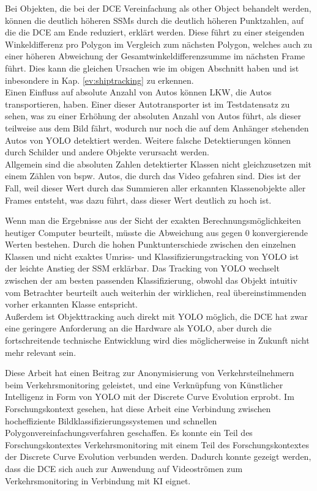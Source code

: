 {{	Bei Objekten, die bei der DCE Vereinfachung als \glqq other Object\grqq{} behandelt werden, können die deutlich höheren SSMs durch die deutlich höheren Punktzahlen, auf die die DCE am Ende reduziert, erklärt werden. Diese führt zu einer steigenden Winkeldifferenz pro Polygon im Vergleich zum nächsten Polygon, welches auch zu einer höheren Abweichung der Gesamtwinkeldifferenzsumme im nächsten Frame führt. Dies kann die gleichen Ursachen wie im obigen Abschnitt haben und ist inbesondere in Kap. \ref{ev:shiptracking} zu erkennen. \\

	Einen Einfluss auf absolute Anzahl von Autos können LKW, die Autos transportieren, haben. Einer dieser Autotransporter ist im Testdatensatz zu sehen, was zu einer Erhöhung der absoluten Anzahl von Autos führt, als dieser teilweise aus dem Bild fährt, wodurch nur noch die auf dem Anhänger stehenden Autos von YOLO detektiert werden. Weitere falsche Detektierungen können durch Schilder und andere Objekte verursacht werden. \\
	Allgemein sind die absoluten Zahlen detektierter Klassen nicht gleichzusetzen mit einem Zählen von bspw. Autos, die durch das Video gefahren sind. Dies ist der Fall, weil dieser Wert durch das Summieren aller erkannten Klassenobjekte aller Frames entsteht, was dazu führt, dass dieser Wert deutlich zu hoch ist.

	Wenn man die Ergebnisse aus der Sicht der exakten Berechnungsmöglichkeiten heutiger Computer beurteilt, müsste die Abweichung aus gegen 0 konvergierende Werten bestehen. Durch die hohen Punktunterschiede zwischen den einzelnen Klassen und nicht exaktes Umriss- und Klassifizierungstracking von YOLO ist der leichte Anstieg der SSM erklärbar. Das Tracking von YOLO wechselt zwischen der am besten passenden Klassifizierung, obwohl das Objekt intuitiv vom Betrachter beurteilt auch weiterhin der wirklichen, real übereinstimmenden vorher erkannten Klasse entspricht. \\
	Außerdem ist Objekttracking auch direkt mit YOLO möglich, die DCE hat zwar eine geringere Anforderung an die Hardware als YOLO, aber durch die fortschreitende technische Entwicklung wird dies möglicherweise in Zukunft nicht mehr relevant sein. 

	Diese Arbeit hat einen Beitrag zur Anonymisierung von Verkehrsteilnehmern beim Verkehrsmonitoring geleistet, und eine Verknüpfung von Künstlicher Intelligenz in Form von YOLO mit der Discrete Curve Evolution erprobt. Im Forschungskontext gesehen, hat diese Arbeit eine Verbindung zwischen hocheffiziente Bildklassifizierungssystemen und schnellen Polygonvereinfachungsverfahren geschaffen. Es konnte ein Teil des Forschungskontextes Verkehrsmonitoring mit einem Teil des Forschungskontextes der Discrete Curve Evolution verbunden werden. Dadurch konnte gezeigt werden, dass die DCE sich auch zur Anwendung auf Videoströmen zum Verkehrsmonitoring in Verbindung mit KI eignet. \\

	


	
	}

}




